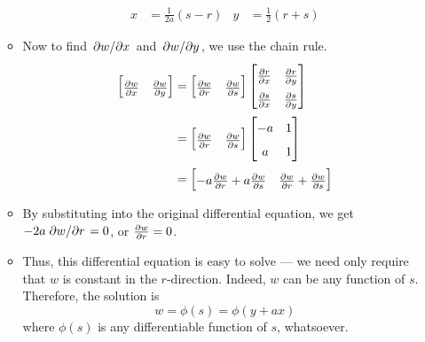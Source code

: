 \documentclass[../main.tex]{subfiles}
\begin{document}
\begin{itemize}
\begin{itemize}
        \begin{align*}
            x &= \frac{1}{2a}(s-r)&
                y &= \frac{1}{2}(r+s)
        \end{align*}
        \item Now to find $\pdv*{w}{x}$ and $\pdv*{w}{y}$, we use the chain rule.
        \begin{align*}
            \begin{bmatrix}
                \pdv{w}{x} & \pdv{w}{y}\\
            \end{bmatrix}
            &=
            \begin{bmatrix}
                \pdv{w}{r} & \pdv{w}{s}\\
            \end{bmatrix}
            \renewcommand{\arraystretch}{1.6}
            \begin{bmatrix}
                \pdv{r}{x} & \pdv{r}{y}\\
                \pdv{s}{x} & \pdv{s}{y}\\
            \end{bmatrix}\\
            &=
            \begin{bmatrix}
                \pdv{w}{r} & \pdv{w}{s}\\
            \end{bmatrix}
            \begin{bmatrix}
                -a & 1\\
                a & 1\\
            \end{bmatrix}\\
            &=
            \begin{bmatrix}
                -a\pdv{w}{r}+a\pdv{w}{s} & \pdv{w}{r}+\pdv{w}{s}
            \end{bmatrix}
        \end{align*}
        \item By substituting into the original differential equation, we get $-2a\pdv*{w}{r}=0$, or $\pdv{w}{r}=0$.
        \item Thus, this differential equation is easy to solve --- we need only require that $w$ is constant in the $r$-direction. Indeed, $w$ can be any function of $s$. Therefore, the solution is
        \begin{equation*}
            w = \phi(s) = \phi(y+ax)
        \end{equation*}
        where $\phi(s)$ is any differentiable function of $s$, whatsoever.

\end{itemize}
\end{itemize}
\end{document}
